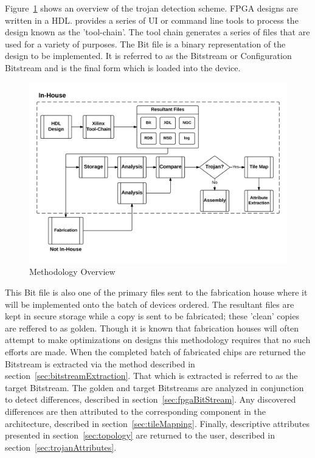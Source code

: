 Figure~\ref{fig:methodologyOverview} shows an overview of the trojan detection scheme.
\acrshort{FPGA} designs are written in a \acrfull{HDL}.
\Xilinx provides a series of \acrfull{UI} or command line tools to process the design known as the 'tool-chain'.
The tool chain generates a series of files that are used for a variety of purposes.
The Bit file is a binary representation of the design to be implemented.
It is referred to as the \gls{Bitstream} or Configuration \gls{Bitstream} and is the final form which is loaded into the device.
\begin{figure}
	\centering
	\includegraphics[width=1\linewidth]{Figures/methodologyOverview}
	\caption[Methodology Overview]{Methodology Overview}
	\label{fig:methodologyOverview}
\end{figure}
This Bit file is also one of the primary files sent to the fabrication house where it will be implemented onto the batch of devices ordered.
The resultant files are kept in secure storage while a copy is sent to be fabricated; these 'clean' copies are reffered to as \gls{golden}.
Though it is known that fabrication houses will often attempt to make optimizations on designs this methodology requires that no such efforts are made.
When the completed batch of fabricated chips are returned the \gls{Bitstream} is extracted via the method described in section~\ref{sec:bitstreamExtraction}. 
That which is extracted is referred to as the \gls{target} \gls{Bitstream}.
The \gls{golden} and \gls{target} \gls{Bitstream}s are analyzed in conjunction to detect differences, described in section~\ref{sec:fpgaBitStream}.
Any discovered differences are then attributed to the corresponding component in the architecture, described in section~\ref{sec:tileMapping}.
Finally, descriptive attributes presented in section~\ref{sec:topology} are returned to the user, described in section~\ref{sec:trojanAttributes}. 


